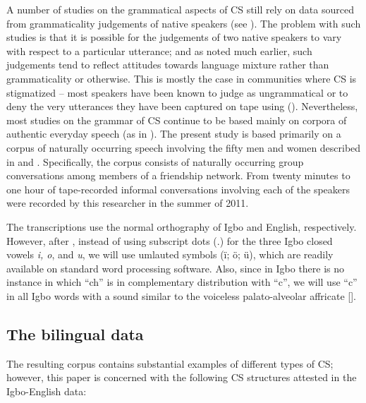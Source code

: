 \documentclass[output=paper]{langsci/langscibook}
\begin{document}
A number of studies on the grammatical aspects of CS still rely on data sourced from grammaticality judgements of native speakers (see \citealt{MacSwan2009}). The problem with such studies is that it is possible for the judgements of two native speakers to vary with respect to a particular utterance; and as \citet{Daller1991} noted much earlier, such judgements tend to reflect attitudes towards language mixture rather than grammaticality or otherwise. This is mostly the case in communities where CS is stigmatized – most speakers have been known to judge as ungrammatical or to deny the very utterances they have been captured on tape using (\citealt[99]{MacSwan1999}). Nevertheless, most studies on the grammar of CS continue to be based mainly on corpora of authentic everyday speech (as in \citealt{MyersScottonJake2014}). The present study is based primarily on a corpus of naturally occurring speech involving the fifty men and women described in  and . Specifically, the corpus consists of naturally occurring group conversations among members of a friendship network. From twenty minutes to one hour of tape-recorded informal conversations involving each of the speakers were recorded by this researcher in the summer of 2011. 

The transcriptions use the normal orthography of Igbo and English, respectively. However, after \citet{Echeruo1998}, instead of using subscript dots (.) for the three Igbo closed vowels \textit{i, o}, and \textit{u}, we will use umlauted symbols (ï; ö; ü), which are readily available on standard word processing software. Also, since in Igbo there is no instance in which “ch” is in complementary distribution with “c”, we will use “c” in all Igbo words with a sound similar to the voiceless palato-alveolar affricate []. 

\subsection{The bilingual data}

The resulting corpus contains substantial examples of different types of CS; however, this paper is concerned with the following CS structures attested in the Igbo-English data:
\end{document}
